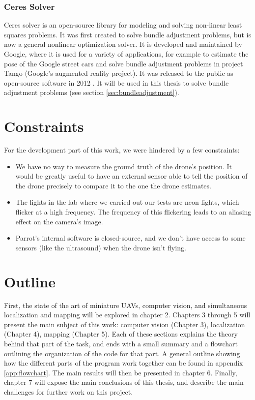 \subsubsection{Ceres Solver}
Ceres solver \cite{ceres-solver} is an open-source library for modeling and solving non-linear least squares problems. It was first created to solve bundle adjustment problems, but is now a general nonlinear optimization solver. It is developed and maintained by Google, where it is used for a variety of applications, for example to estimate the pose of the Google street cars and solve bundle adjustment problems in project Tango (Google's augmented reality project). It was released to the public as open-source software in 2012 \cite{introducingceres}. It will be used in this thesis to solve bundle adjustment problems (see section \ref{sec:bundleadjustment}).

\section{Constraints}
For the development part of this work, we were hindered by a few constraints:
\begin{itemize}
\item We have no way to measure the ground truth of the drone's position. It would be greatly useful to have an external sensor able to tell the position of the drone precisely to compare it to the one the drone estimates.
\item The lights in the lab where we carried out our tests are neon lights, which flicker at a high frequency. The frequency of this flickering leads to an aliasing effect on the camera's image.
\item Parrot's internal software is closed-source, and we don't have access to some sensors (like the ultrasound) when the drone isn't flying.
\end{itemize}

\section{Outline}
First, the state of the art of miniature UAVs, computer vision, and simultaneous localization and mapping will be explored in chapter 2. Chapters 3 through 5 will present the main subject of this work: computer vision (Chapter 3), localization (Chapter 4), mapping (Chapter 5). Each of these sections explains the theory behind that part of the task, and ends with a small summary and a flowchart outlining the organization of the code for that part. A general outline showing how the different parts of the program work together can be found in appendix \ref{app:flowchart}. The main results will then be presented in chapter 6. Finally, chapter 7 will expose the main conclusions of this thesis, and describe the main challenges for further work on this project.
